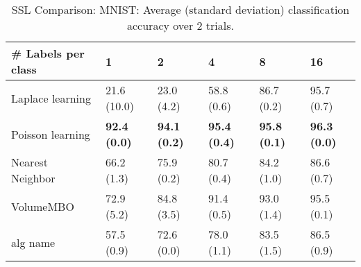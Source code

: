 \documentclass{article}
\begin{document}
\begin{table*}[t!]
\vspace{-3mm}
\caption{SSL Comparison: MNIST: Average (standard deviation) classification accuracy over 2 trials.}
\vspace{-3mm}
\label{tab:SSL Comparison: MNIST}
\vskip 0.15in
\begin{center}
\begin{small}
\begin{sc}
\begin{tabular}{llllll}
\toprule
\# Labels per class&\textbf{1}&\textbf{2}&\textbf{4}&\textbf{8}&\textbf{16}\\
\midrule
Laplace learning&21.6 (10.0)      &23.0 (4.2)      &58.8 (0.6)      &86.7 (0.2)      &95.7 (0.7)      \\
Poisson learning&{\bf 92.4 (0.0)}&{\bf 94.1 (0.2)}&{\bf 95.4 (0.4)}&{\bf 95.8 (0.1)}&{\bf 96.3 (0.0)}\\
Nearest Neighbor&66.2 (1.3)      &75.9 (0.2)      &80.7 (0.4)      &84.2 (1.0)      &86.6 (0.7)      \\
VolumeMBO      &72.9 (5.2)      &84.8 (3.5)      &91.4 (0.5)      &93.0 (1.4)      &95.5 (0.1)      \\
alg name       &57.5 (0.9)      &72.6 (0.0)      &78.0 (1.1)      &83.5 (1.5)      &86.5 (0.9)      \\
\bottomrule
\end{tabular}
\end{sc}
\end{small}
\end{center}
\vskip -0.1in
\end{table*}
\end{document}
